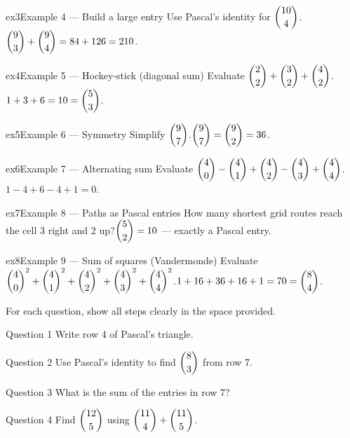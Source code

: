 \documentclass[11pt]{article}
\begin{document}
\begin{example}{ex3}{Example 4 --- Build a large entry}
Use Pascal's identity for $\dbinom{10}{4}$.\soln $\dbinom{9}{3}+\dbinom{9}{4}=84+126=210$.
\end{example}

\begin{example}{ex4}{Example 5 --- Hockey-stick (diagonal sum)}
Evaluate $\dbinom{2}{2}+\dbinom{3}{2}+\dbinom{4}{2}$.\soln $1+3+6=10=\dbinom{5}{3}$.
\end{example}

\begin{example}{ex5}{Example 6 --- Symmetry}
Simplify $\dbinom{9}{7}$.\soln $\dbinom{9}{7}=\dbinom{9}{2}=36$.
\end{example}

\begin{example}{ex6}{Example 7 --- Alternating sum}
Evaluate $\dbinom{4}{0}-\dbinom{4}{1}+\dbinom{4}{2}-\dbinom{4}{3}+\dbinom{4}{4}$.\soln $1-4+6-4+1=0$.
\end{example}

\begin{example}{ex7}{Example 8 --- Paths as Pascal entries}
How many shortest grid routes reach the cell 3 right and 2 up?\soln $\dbinom{5}{2}=10$ --- exactly a Pascal entry.
\end{example}

\begin{example}{ex8}{Example 9 --- Sum of squares (Vandermonde)}
Evaluate $\dbinom{4}{0}^2+\dbinom{4}{1}^2+\dbinom{4}{2}^2+\dbinom{4}{3}^2+\dbinom{4}{4}^2$.\soln $1+16+36+16+1=70=\dbinom{8}{4}$.
\end{example}

\clearpage
{}
For each question, show all steps clearly in the space provided.

\begin{qbox}{Question 1}
Write row 4 of Pascal's triangle.\workspace{2.4cm}
\end{qbox}

\begin{qbox}{Question 2}
Use Pascal's identity to find $\dbinom{8}{3}$ from row 7.\workspace{2.4cm}
\end{qbox}

\begin{qbox}{Question 3}
What is the sum of the entries in row 7?\workspace{2.4cm}
\end{qbox}

\begin{qbox}{Question 4}
Find $\dbinom{12}{5}$ using $\dbinom{11}{4}+\dbinom{11}{5}$.\workspace{2.4cm}
\end{qbox}
\end{document}
